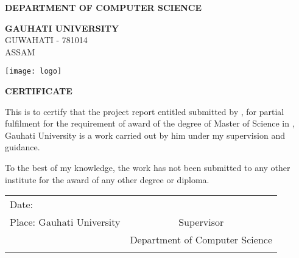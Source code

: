 \cleardoublepage
\thispagestyle{empty}

\begin{center}
 \textbf{\large DEPARTMENT OF COMPUTER SCIENCE}

  \vspace{0.2cm}
 \textbf{\LARGE GAUHATI UNIVERSITY}\\
 {\large GUWAHATI - 781014}\\
 {\large ASSAM}

 \vspace{1cm}

 \texttt{[image: logo]}

 \vspace{2cm}

 \textbf{\large CERTIFICATE}

 \vspace{2cm}

\end{center}

This is to certify that the project report entitled \textbf{\thesistitle} submitted by \textbf{\name}, for partial fulfilment for the requirement of award of the degree of Master of Science in \textbf{\degree}, Gauhati University is a work carried out by him under my supervision and guidance.

To the best of my knowledge, the work has not been submitted to any other institute for the award of any other degree or diploma.

 \vspace{3cm}

\begin{tabular}{p{8cm} c}
Date:	 \submissiondate & \supervisor \\
Place: Gauhati University	& Supervisor \\
	&	Department of Computer Science \\
	&	\\
\end{tabular}

